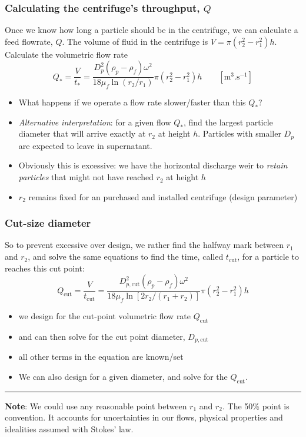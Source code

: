 \begin{frame}\frametitle{Calculating the centrifuge's throughput, $Q$}
	Once we know how long a particle should be in the centrifuge, we can calculate a feed flowrate, $Q$.
	The volume of fluid in the centrifuge is $V = \pi \left(r_2^2 - r_1^2\right) h$. Calculate the volumetric flow rate
	\[
		Q_* = \frac{V}{t_*} = \frac{D_p^2\left(\rho_p - \rho_f\right)\omega^2}{18 \mu_f \ln (r_2/r_1)} \pi \left(r_2^2 - r_1^2\right) h \qquad[\text{m}^3.\text{s}^{-1}]
	\]
	\begin{itemize}
		\item	What happens if we operate a flow rate slower/faster than this $Q_*$?
		\item	\emph{Alternative interpretation}: for a given flow $Q_*$, find the largest particle diameter that will arrive exactly at $r_2$ at height $h$. Particles with smaller $D_p$ are expected to leave in supernatant.
		\item	Obviously this is excessive: we have the horizontal discharge weir to \emph{retain particles} that might not have reached $r_2$ at height $h$
		\item	$r_2$ remains fixed for an purchased and installed centrifuge (design parameter)
	\end{itemize}
\end{frame}

\begin{frame}\frametitle{Cut-size diameter}
	So to prevent excessive over design, we rather find the halfway mark between $r_1$ and $r_2$, and solve the same equations to find the time, called $t_\text{cut}$, for a particle to reaches this {\color{purple}cut point}:
	\[
		Q_\text{cut} = \frac{V}{t_\text{cut}} = \frac{D_{p,\text{cut}}^2\left(\rho_p - \rho_f\right)\omega^2}{18 \mu_f \ln \left[2r_2/(r_1+r_2)\right]} \pi \left(r_2^2 - r_1^2\right) h
	\]
	\begin{itemize}
		\item	we design for the cut-point volumetric flow rate $Q_\text{cut}$
		\item	and can then solve for the cut point diameter, $D_{p,\text{cut}}$
		\item	all other terms in the equation are known/set
		\item	We can also design for a given diameter, and solve for the $Q_\text{cut}$.
	\end{itemize}
	\vspace{6pt}
	\hrule
	\vspace{6pt}
	{\small \textbf{Note}: We could use any reasonable point between $r_1$ and $r_2$. The 50\% point is convention. It accounts for uncertainties in our flows, physical properties and idealities assumed with Stokes' law.}
\end{frame}

